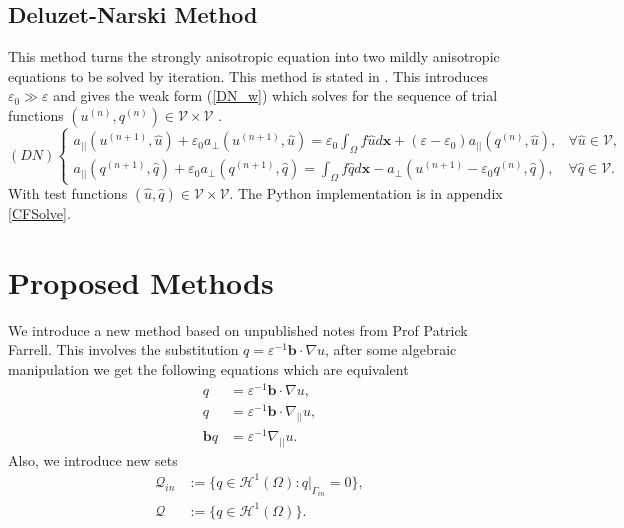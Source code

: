 \documentclass[12pt]{ociamthesis}
\begin{document}
\subsection{Deluzet-Narski Method} \label{DN}
This method turns the strongly anisotropic equation into two mildly anisotropic equations to be solved by iteration. This method is stated in \cite{DN}. This introduces $\varepsilon_0 \gg \varepsilon$ and gives the weak form (\ref{DN_w}) which solves for the sequence of trial functions $(u^{(n)}, q^{(n)}) \in \mathcal{V} \times \mathcal{V}$ .
 \begin{equation} \label{DN_w}
 (DN)
   \begin{cases}
  a_{||}(u^{(n+1)}, \hat{u}) + \varepsilon_0 a_{\perp}(u^{(n+1)}, \hat{u}) = 
  \varepsilon_0 \int_{\Omega} f \hat{u} d\mathbf{x}
  +(\varepsilon-\varepsilon_0)a_{||}(q^{(n)}, \hat{u}),
  & \forall \hat{u} \in \mathcal{V},\\
  a_{||}(q^{(n+1)}, \hat{q}) + \varepsilon_0 a_{\perp}(q^{(n+1)}, \hat{q}) = 
  \int_{\Omega} f \hat{q} d\mathbf{x}
  -a_{\perp}(u^{(n+1)} - \varepsilon_0 q^{(n)}, \hat{q}),
  & \forall \hat{q} \in \mathcal{V}.
  \end{cases}
  \end{equation}
With test functions $(\hat{u}, \hat{q}) \in \mathcal{V} \times \mathcal{V}$. The Python implementation is in appendix \ref{CFSolve}.

\section{Proposed Methods}
We introduce a new method based on unpublished notes from Prof Patrick Farrell. This involves the substitution $q=\varepsilon^{-1} \mathbf{b} \cdot \nabla u$, after some algebraic manipulation we get the following equations which are equivalent
\begin{align}
q &= \varepsilon^{-1} \mathbf{b}\cdot \nabla u,\\
q &= \varepsilon^{-1} \mathbf{b} \cdot \nabla_{||} u, \\
\mathbf{b}q &= \varepsilon^{-1} \nabla_{||} u.
\end{align}
Also, we introduce new sets 
\begin{align}
\mathcal{Q}_{in} &:= \{ q \in \mathcal{H}^1(\Omega) : q|_{\Gamma_{in}}=0\}, \\
\mathcal{Q} &:= \{ q \in \mathcal{H}^1(\Omega)\}.
\end{align}
\end{document}
